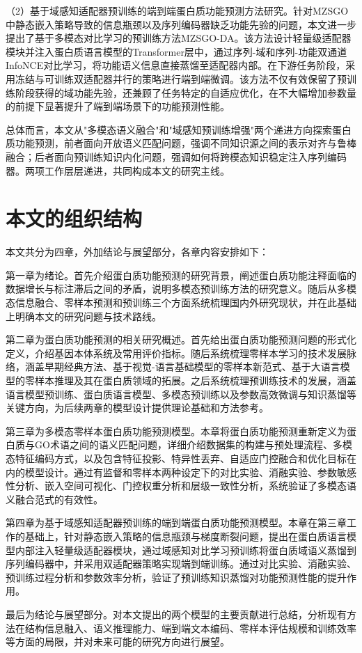 （2）基于域感知适配器预训练的端到端蛋白质功能预测方法研究。针对MZSGO中静态嵌入策略导致的信息瓶颈以及序列编码器缺乏功能先验的问题，本文进一步提出了基于多模态对比学习的预训练方法MZSGO-DA。该方法设计轻量级适配器模块并注入蛋白质语言模型的Transformer层中，通过序列-域和序列-功能双通道InfoNCE对比学习，将功能语义信息直接蒸馏至适配器内部。在下游任务阶段，采用冻结与可训练双适配器并行的策略进行端到端微调。该方法不仅有效保留了预训练阶段获得的域功能先验，还兼顾了任务特定的自适应优化，在不大幅增加参数量的前提下显著提升了端到端场景下的功能预测性能。

总体而言，本文从"多模态语义融合"和"域感知预训练增强"两个递进方向探索蛋白质功能预测，前者面向开放语义匹配问题，强调不同知识源之间的表示对齐与鲁棒融合；后者面向预训练知识内化问题，强调如何将跨模态知识稳定注入序列编码器。两项工作层层递进，共同构成本文的研究主线。

\section{本文的组织结构}

本文共分为四章，外加结论与展望部分，各章内容安排如下：

第一章为绪论。首先介绍蛋白质功能预测的研究背景，阐述蛋白质功能注释面临的数据增长与标注滞后之间的矛盾，说明多模态预训练方法的研究意义。随后从多模态信息融合、零样本预测和预训练三个方面系统梳理国内外研究现状，并在此基础上明确本文的研究问题与技术路线。

第二章为蛋白质功能预测的相关研究概述。首先给出蛋白质功能预测问题的形式化定义，介绍基因本体系统及常用评价指标。随后系统梳理零样本学习的技术发展脉络，涵盖早期经典方法、基于视觉-语言基础模型的零样本新范式、基于大语言模型的零样本推理及其在蛋白质领域的拓展。之后系统梳理预训练技术的发展，涵盖语言模型预训练、蛋白质语言模型、多模态预训练以及参数高效微调与知识蒸馏等关键方向，为后续两章的模型设计提供理论基础和方法参考。

第三章为多模态零样本蛋白质功能预测模型。本章将蛋白质功能预测重新定义为蛋白质与GO术语之间的语义匹配问题，详细介绍数据集的构建与预处理流程、多模态特征编码方式，以及包含特征投影、特异性丢弃、自适应门控融合和优化目标在内的模型设计。通过有监督和零样本两种设定下的对比实验、消融实验、参数敏感性分析、嵌入空间可视化、门控权重分析和层级一致性分析，系统验证了多模态语义融合范式的有效性。

第四章为基于域感知适配器预训练的端到端蛋白质功能预测模型。本章在第三章工作的基础上，针对静态嵌入策略的信息瓶颈与梯度断裂问题，提出在蛋白质语言模型内部注入轻量级适配器模块，通过域感知对比学习预训练将蛋白质域语义蒸馏到序列编码器中，并采用双适配器策略实现端到端训练。通过对比实验、消融实验、预训练过程分析和参数效率分析，验证了预训练知识蒸馏对功能预测性能的提升作用。

最后为结论与展望部分。对本文提出的两个模型的主要贡献进行总结，分析现有方法在结构信息融入、语义推理能力、端到端文本编码、零样本评估规模和训练效率等方面的局限，并对未来可能的研究方向进行展望。